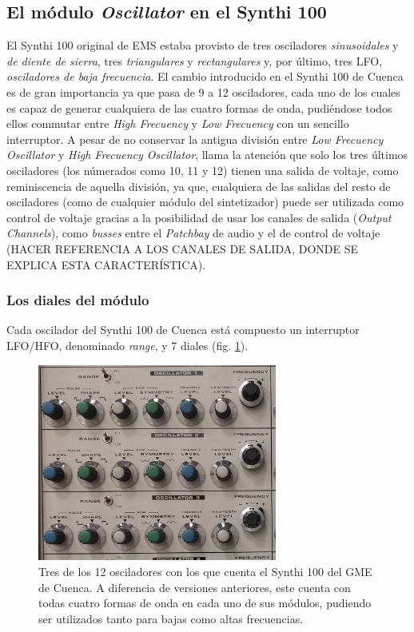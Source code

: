 \subsection{El módulo \textit{Oscillator} en el Synthi 100}

El Synthi 100 original de EMS estaba provisto de tres osciladores \textit{sinusoidales} y \textit{de diente de sierra}, tres \textit{triangulares} y \textit{rectangulares} y, por último, tres LFO, \textit{osciladores de baja frecuencia}. El cambio introducido en el Synthi 100 de Cuenca es de gran importancia ya que pasa de 9 a 12 osciladores, cada uno de los cuales es capaz de generar cualquiera de las cuatro formas de onda, pudiéndose todos ellos commutar entre \textit{High Frecuency} y \textit{Low Frecuency} con un sencillo interruptor. A pesar de no conservar la antigua división entre \textit{Low Frecuency Oscillator} y \textit{High Frecuency Oscillator}, llama la atención que solo los tres últimos osciladores (los númerados como 10, 11 y 12) tienen una salida de voltaje, como reminiscencia de aquella división, ya que, cualquiera de las salidas del resto de osciladores (como de cualquier módulo del sintetizador) puede ser utilizada como control de voltaje gracias a la posibilidad de usar los canales de salida (\textit{Output Channels}), como \textit{busses} entre el \textit{Patchbay} de audio y el de control de voltaje (HACER REFERENCIA A LOS CANALES DE SALIDA, DONDE SE EXPLICA ESTA CARACTERÍSTICA).



\subsubsection{Los diales del módulo}

Cada oscilador del Synthi 100 de Cuenca está compuesto un interruptor LFO/HFO, denominado \textit{range}, y 7 diales (fig. \ref{fig:osciladores}).

\begin{figure}
	\centering
	\includegraphics[width=0.7\textwidth]{images/osciladores}
	\caption{Tres de los 12 osciladores con los que cuenta el Synthi 100 del GME de Cuenca. A diferencia de versiones anteriores, este cuenta con todas cuatro formas de onda en cada uno de sus módulos, pudiendo ser utilizados tanto para bajas como altas frecuencias.}
	\label{fig:osciladores}
\end{figure}

